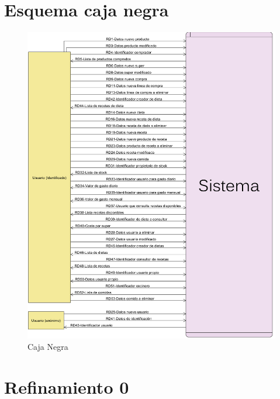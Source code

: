 \documentclass[a4paper,12pt]{report}
\begin{document}
\chapter{Esquema caja negra}
\label{sec-3}
\begin{figure}[!htp]
\centering
\includegraphics[width=1\linewidth]{./refinamientos/cajanegra.png}
\caption{Caja Negra}
\label{fig:Caja Negra}
\medskip
\footnotesize
{}
\end{figure}
\chapter{Refinamiento 0}
\label{sec-4}
\end{document}

